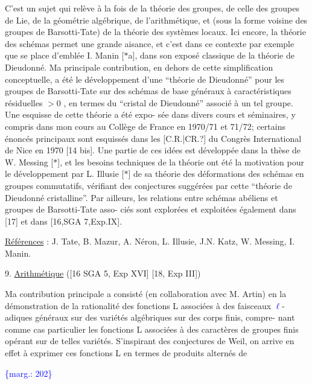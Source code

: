 \documentclass[11pt]{article}
\newcommand{\scanpage}[1]{\par\bigskip\noindent{\small\sffamily[scan #1]}\par}
\newcommand{\mspage}[1]{{\small\sffamily[p.\,#1]}}
\newcommand{\hand}[1]{\textcolor{blue}{#1}}
\newcommand{\margin}[1]{\textcolor{blue}{\{\textsf{marg.:} #1\}}}
\newcommand{\uline}[1]{\underline{#1}}
\newcommand{\unsure}[1]{[#1?]}
\begin{document}
C'est un sujet qui relève à la fois de la théorie des groupes, de
celle des groupes de Lie, de la géométrie algébrique, de l'arithmétique, et
(sous la forme voisine des groupes de Barsotti-Tate) de la théorie des systèmes
locaux. Ici encore, la théorie des schémas permet une grande aisance, et c'est
dans ce contexte par exemple que se place d'emblée I. Manin [$*$a], dans son
exposé classique de la théorie de Dieudonné. Ma principale contribution, en
dehors de cette simplification conceptuelle, a été le développement d'une
``théorie de Dieudonné'' pour les groupes de Barsotti-Tate sur des schémas de
base généraux à caractéristiques résiduelles $>0$ , en termes du ``cristal de
Dieudonné'' associé à un tel groupe. Une esquisse de cette théorie a été expo-%
sée dans divers cours et séminaires, y compris dans mon cours au Collège de
France en 1970/71 et 71/72; certains énoncés principaux sont esquissés dans
les \unsure{C.R.|CR.} du Congrès International de Nice en 1970 [14 bis]. Une partie de ces
idées est développée dans la thèse de W. Messing [$*$], et les besoins techniques
de la théorie ont été la motivation pour le développement par L. Illusie [$*$]
de sa théorie des déformations des schémas en groupes commutatifs, vérifiant
des conjectures suggérées par cette ``théorie de Dieudonné cristalline''. Par
ailleurs, les relations entre schémas abéliens et groupes de Barsotti-Tate asso-%
ciés sont explorées et exploitées également dans [17] et dans [16,SGA 7,Exp.IX].

\uline{Références} : J. Tate, B. Mazur, A. Néron, L. Illusie, J.N. Katz, W. Messing,
I. Manin.

9. \uline{Arithmétique} ([16 SGA 5, Exp XVI] [18, Exp III])

Ma contribution principale a consisté (en collaboration avec M. Artin)
en la démonstration de la rationalité des fonctions L associées à des faisceaux
\hand{$\ell$}-adiques généraux sur des variétés algébriques sur des corps finis, compre-%
nant comme cas particulier les fonctions L associées à des caractères de groupes
finis opérant sur de telles variétés. S'inspirant des conjectures de Weil, on
arrive en effet à exprimer ces fonctions L en termes de produits alternés de

\margin{202}

\clearpage
\scanpage{119/203}
\mspage{- 8 -}
\end{document}
